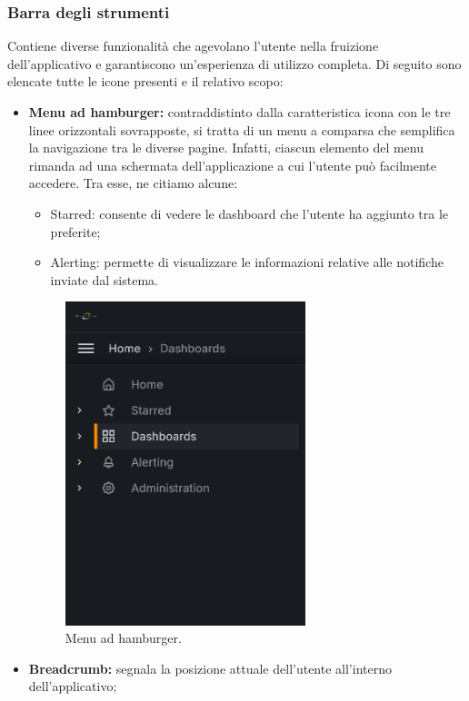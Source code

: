 \documentclass[8pt]{article}
\begin{document}
\subsubsection{Barra degli strumenti} 
Contiene diverse funzionalità che agevolano l'utente nella fruizione dell'applicativo e garantiscono un'esperienza di utilizzo completa. Di seguito sono elencate tutte le icone presenti e il relativo scopo:
\begin{itemize}
    \item \textbf{Menu ad hamburger:} contraddistinto dalla caratteristica icona con le tre linee orizzontali sovrapposte, si tratta di un menu a comparsa che semplifica la navigazione tra le diverse pagine. Infatti, ciascun elemento del menu rimanda ad una schermata dell'applicazione a cui l'utente può facilmente accedere. Tra esse, ne citiamo alcune: 
    \begin{itemize}
        \item Starred: consente di vedere le dashboard che l'utente ha aggiunto tra le preferite;
        \item Alerting: permette di visualizzare le informazioni relative alle notifiche inviate dal sistema.
    \end{itemize}
    \begin{figure}[H]
        \centering
        \includegraphics[width=7cm]{./images_mu/hamburger_menu.png}
        \caption{Menu ad hamburger.}
        \label{figure:Menu ad hamburger.}
    \end{figure}
    \item \textbf{Breadcrumb:} segnala la posizione attuale dell'utente all'interno dell'applicativo;
    \begin{figure}[H]

\end{figure}
\end{itemize}
\end{document}
